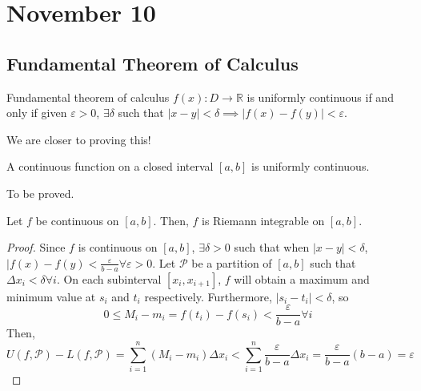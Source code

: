 \chapter{November 10}

\section{Fundamental Theorem of Calculus}
\begin{definition}{Fundamental theorem of calculus}{}
    $f(x): D \to \mathbb{R}$ is uniformly continuous if and only if given $\varepsilon > 0$, $\exists \delta$ such that $|x - y| < \delta \implies |f(x) - f(y)| < \varepsilon$.
\end{definition}
\begin{note}
    We are closer to proving this!
\end{note}

\begin{theorem}{}{}
    A continuous function on a closed interval $[a, b]$ is uniformly continuous.
\end{theorem}
\begin{note}
    To be proved.
\end{note}

\begin{theorem}{}{}
    Let $f$ be continuous on $[a, b]$. Then, $f$ is Riemann integrable on $[a, b]$.
\end{theorem}
\begin{proof}
    Since $f$ is continuous on $[a, b]$, $\exists \delta > 0$ such that when $|x - y| < \delta$, $|f(x) - f(y) < \frac{\varepsilon}{b - a} \forall \varepsilon > 0$. Let $\mathcal{P}$ be a partition of $[a, b]$ such that $\Delta x_i < \delta \forall i$. On each subinterval $[x_i, x_{i + 1}]$, $f$ will obtain a maximum and minimum value at $s_i$ and $t_i$ respectively. Furthermore, $|s_i - t_i| < \delta$, so $$0 \leq M_i - m_i = f(t_i) - f(s_i) < \frac{\varepsilon}{b - a} \forall i$$ Then, $$U(f, \mathcal{P}) - L(f, \mathcal{P}) = \sum_{i = 1}^n (M_i - m_i) \Delta x_i < \sum_{i = 1}^n \frac{\varepsilon}{b - a} \Delta x_i = \frac{\varepsilon}{b - a} (b - a) = \varepsilon$$
\end{proof}

